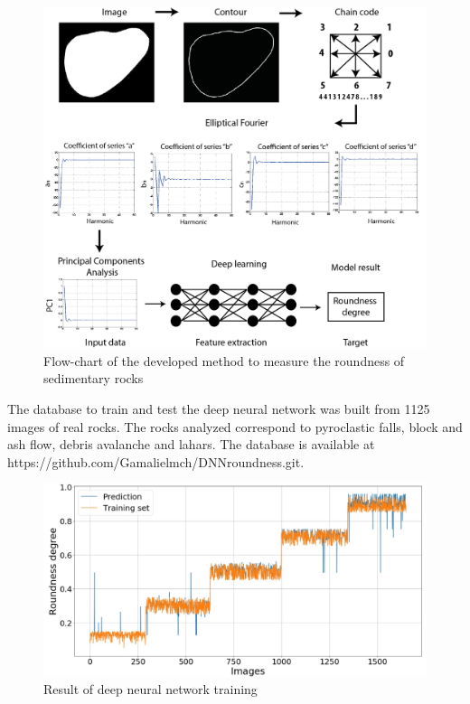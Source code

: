 \documentclass[conference]{IEEEtran}
\begin{document}
\begin{figure}[htbp]
\centerline{\includegraphics[scale=0.6]{fig5.png}}
\caption{Flow-chart of the developed method to measure the roundness of sedimentary rocks}
\label{fig5}
\end{figure}

The database to train and test the deep neural network was built from 1125 images of real rocks. The rocks analyzed correspond to pyroclastic falls, block and ash flow, debris avalanche and lahars. The database is available at https://github.com/Gamalielmch/DNN\textunderscore roundness.git.

\begin{figure}[htbp]
	\centerline{\includegraphics[scale=0.3]{fig6.png}}
	\caption{Result of deep neural network training}
	\label{fig6}
\end{figure}
\end{document}
